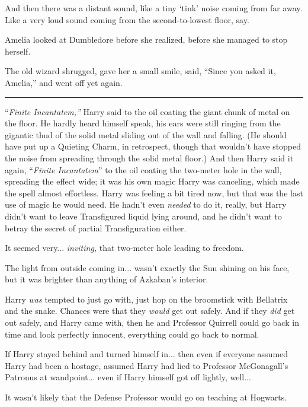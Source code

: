 And then there was a distant sound, like a tiny `tink' noise coming from far away. Like a very loud sound coming from the second-to-lowest floor, say.

Amelia looked at Dumbledore before she realized, before she managed to stop herself.

The old wizard shrugged, gave her a small smile, said, ``Since you asked it, Amelia,'' and went off yet again.

\begin{center}\rule{3in}{0.4pt}\end{center}

``\emph{Finite Incantatem,''} Harry said to the oil coating the giant chunk of metal on the floor. He hardly heard himself speak, his ears were still ringing from the gigantic thud of the solid metal sliding out of the wall and falling. (He should have put up a Quieting Charm, in retrospect, though that wouldn't have stopped the noise from spreading through the solid metal floor.) And then Harry said it again, ``\emph{Finite Incantatem}'' to the oil coating the two-meter hole in the wall, spreading the effect wide; it was his own magic Harry was canceling, which made the spell almost effortless. Harry was feeling a bit tired now, but that was the last use of magic he would need. He hadn't even \emph{needed} to do it, really, but Harry didn't want to leave Transfigured liquid lying around, and he didn't want to betray the secret of partial Transfiguration either.

It seemed very... \emph{inviting,} that two-meter hole leading to freedom.

The light from outside coming in... wasn't exactly the Sun shining on his face, but it was brighter than anything of Azkaban's interior.

Harry \emph{was} tempted to just go with, just hop on the broomstick with Bellatrix and the snake. Chances were that they \emph{would} get out safely. And if they \emph{did} get out safely, and Harry came with, then he and Professor Quirrell could go back in time and look perfectly innocent, everything could go back to normal.

If Harry stayed behind and turned himself in... then even if everyone assumed Harry had been a hostage, assumed Harry had lied to Professor McGonagall's Patronus at wandpoint... even if Harry himself got off lightly, well...

It wasn't likely that the Defense Professor would go on teaching at Hogwarts.

